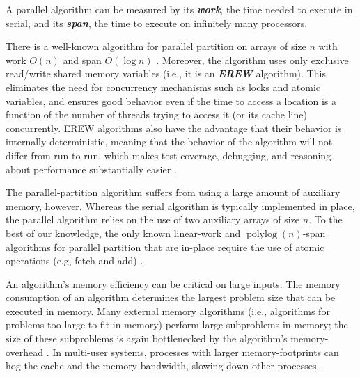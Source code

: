 \documentclass[journal, onecolumn]{IEEEtran}
\newcommand{\defn}[1]       {{\textit{\textbf{\boldmath #1}}}}
\newcommand{\polylog}{\operatorname{polylog}}
\begin{document}


A parallel algorithm can be measured by its \defn{work}, the time
needed to execute in serial, and its \defn{span}, the time to execute
on infinitely many processors.

There is a well-known algorithm for parallel partition on arrays of size $n$ with work $O(n)$ and span
$O(\log n)$ \cite{Blelloch96,AcarBl16}. Moreover, the algorithm uses
only exclusive read/write shared memory variables (i.e., it is an
\defn{EREW} algorithm). This eliminates the need for concurrency
mechanisms such as locks and atomic variables, and ensures good
behavior even if the time to access a location is a function of the
number of threads trying to access it (or its cache line)
concurrently. EREW algorithms also have the advantage that their
behavior is internally deterministic, meaning that
the behavior of the algorithm will not differ from run to run, which
makes test coverage, debugging, and reasoning about performance
substantially easier \cite{BlellochFi12}.

The parallel-partition algorithm suffers from using a large amount of
auxiliary memory, however. Whereas the serial algorithm is typically
implemented in place, the parallel algorithm relies on the use of two
auxiliary arrays of size $n$. To the best of our knowledge, the only
known linear-work and $\operatorname{polylog}(n)$-span algorithms for
parallel partition that are in-place require the use of atomic
operations (e.g, fetch-and-add)
\cite{HeidelbergerNo90,AxtmannWi17,TsigasZh03}.

An algorithm's memory efficiency can be critical on large inputs. The
memory consumption of an algorithm determines the largest problem size
that can be executed in memory. Many external memory algorithms (i.e.,
algorithms for problems too large to fit in memory) perform large
subproblems in memory; the size of these subproblems is again
bottlenecked by the algorithm's memory-overhead \cite{Vitter08}. In
multi-user systems, processes with larger memory-footprints can hog
the cache and the memory bandwidth, slowing down other processes.
\end{document}
